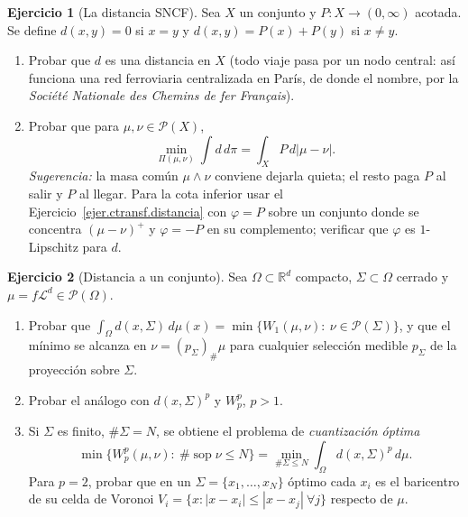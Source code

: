 \documentclass[12pt, a4paper]{amsbook}
\def\sop{\operatorname {\mathrm{sop}}}
\newcommand{\R}{{\mathbb R}}
\newcommand{\LL}{{\mathcal L}}
\theoremstyle{remark}
\theoremstyle{definition}
\newtheorem{ejercicio}{Ejercicio}[chapter]
\numberwithin{section}{chapter}
\numberwithin{subsection}{section}
\numberwithin{equation}{section}
\numberwithin{figure}{chapter}
\begin{document}
\begin{ejercicio}[La distancia SNCF]\label{ejer.KR.SNCF}
Sea $X$ un conjunto y $P\colon X\to(0,\infty)$ acotada. Se define
$d(x,y)=0$ si $x=y$ y $d(x,y)=P(x)+P(y)$ si $x\ne y$.
\begin{enumerate}[label=(\alph*)]
\item Probar que $d$ es una distancia en $X$ (todo viaje pasa por un nodo
central: así funciona una red ferroviaria centralizada en París, de donde
el nombre, por la \emph{Société Nationale des Chemins de fer Français}).
\item Probar que para $\mu,\nu\in\mathcal P(X)$,
\[
\min_{\Pi(\mu,\nu)}\int d\,d\pi=\int_XP\,d|\mu-\nu|.
\]
\emph{Sugerencia:} la masa común $\mu\wedge\nu$ conviene dejarla quieta; el
resto paga $P$ al salir y $P$ al llegar. Para la cota inferior usar el
Ejercicio~\ref{ejer.ctransf.distancia} con $\varphi=P$ sobre un conjunto
donde se concentra $(\mu-\nu)^+$ y $\varphi=-P$ en su complemento; verificar
que $\varphi$ es $1$-Lipschitz para $d$.
\end{enumerate}
\end{ejercicio}

\begin{ejercicio}[Distancia a un conjunto]\label{ejer.Wp.distancia.conjunto}
Sea $\Omega\subset\R^d$ compacto, $\Sigma\subset\Omega$ cerrado y
$\mu=f\LL^d\in\mathcal P(\Omega)$.
\begin{enumerate}[label=(\alph*)]
\item Probar que
$\int_\Omega d(x,\Sigma)\,d\mu(x)=\min\{W_1(\mu,\nu):\ \nu\in\mathcal P(\Sigma)\}$,
y que el mínimo se alcanza en $\nu=(p_\Sigma)_\#\mu$ para cualquier
selección medible $p_\Sigma$ de la proyección sobre $\Sigma$.
\item Probar el análogo con $d(x,\Sigma)^p$ y $W_p^p$, $p>1$.
\item Si $\Sigma$ es finito, $\#\Sigma=N$, se obtiene el problema de
\emph{cuantización óptima}
\[
\min\{W_p^p(\mu,\nu):\ \#\sop\nu\le N\}=\min_{\#\Sigma\le N}\int_\Omega d(x,\Sigma)^p\,d\mu .
\]
Para $p=2$, probar que en un $\Sigma=\{x_1,\dots,x_N\}$ óptimo cada $x_i$ es
el baricentro de su celda de Voronoi $V_i=\{x:|x-x_i|\le|x-x_j|\ \forall j\}$
respecto de $\mu$.
\end{enumerate}
\end{ejercicio}
\end{document}
